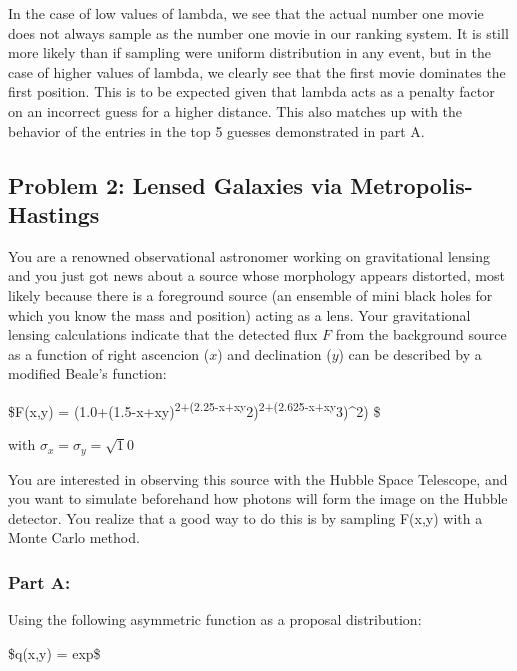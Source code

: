\documentclass[11pt]{article}
\begin{document}
    In the case of low values of lambda, we see that the actual number one
movie does not always sample as the number one movie in our ranking
system. It is still more likely than if sampling were uniform
distribution in any event, but in the case of higher values of lambda,
we clearly see that the first movie dominates the first position. This
is to be expected given that lambda acts as a penalty factor on an
incorrect guess for a higher distance. This also matches up with the
behavior of the entries in the top 5 guesses demonstrated in part A.

    \subsection{Problem 2: Lensed Galaxies via
Metropolis-Hastings}\label{problem-2-lensed-galaxies-via-metropolis-hastings}

You are a renowned observational astronomer working on gravitational
lensing and you just got news about a source whose morphology appears
distorted, most likely because there is a foreground source (an ensemble
of mini black holes for which you know the mass and position) acting as
a lens. Your gravitational lensing calculations indicate that the
detected flux \(F\) from the background source as a function of right
ascencion (\(x\)) and declination (\(y\)) can be described by a modified
Beale's function:

\$F(x,y) =
\exp{} \log (1.0+(1.5-x+xy)\textsuperscript{2+(2.25-x+xy}2)\textsuperscript{2+(2.625-x+xy}3)\^{}2)
\$

with \(\sigma_x = \sigma_y = \sqrt 10\)

You are interested in observing this source with the Hubble Space
Telescope, and you want to simulate beforehand how photons will form the
image on the Hubble detector. You realize that a good way to do this is
by sampling F(x,y) with a Monte Carlo method.

\subsubsection{Part A:}\label{part-a}

Using the following asymmetric function as a proposal distribution:

\$q(x,y) =
 {\rm exp} \$
\end{document}
